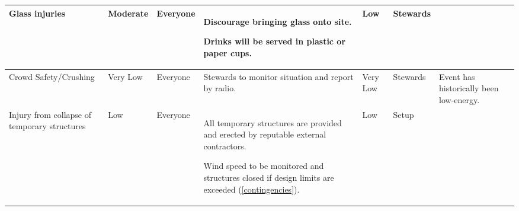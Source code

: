 \begin{landscape}
\begin{table}[h!]
\begin{tabular}{| p{3cm} | l | p{1.5cm} | p{9cm} | p{1.5cm} | p{2cm} | p{5cm} |}
            Glass injuries                                                                                         & Moderate                  & Everyone                                                              &
            Discourage bringing glass onto site.

            Drinks will be served in plastic or paper cups.                                                        &
            Low                                                                                                    & Stewards                  &                                                                                                                                                       \\ \hline

            Crowd Safety/Crushing                                                                                  & Very Low                  & Everyone                                                              &
            Stewards to monitor situation and report by radio.                                                     &
            Very Low                                                                                               & Stewards                  & Event has historically been low-energy.                                                                                                               \\ \hline

            Injury from collapse of temporary structures                                                           & Low                       & Everyone                                                              &
            All temporary structures are provided and erected by reputable external contractors.

            Wind speed to be monitored and structures closed if design limits are exceeded (\cref{contingencies}). &
            Low                                                                                                    & Setup                     &                                                                                                                                                       \\ \hline


\end{tabular}
\end{table}
\end{landscape}
